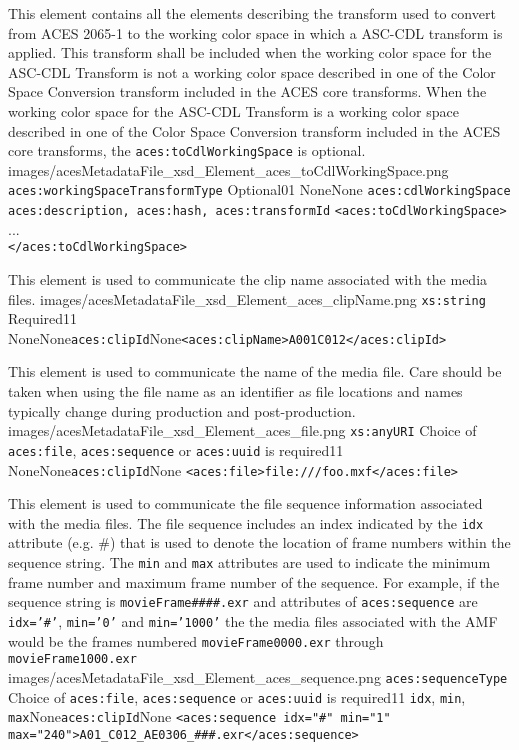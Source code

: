         {This element contains all the elements describing the transform used to convert from ACES 2065-1 to the working color space in which a ASC-CDL transform is applied.  This transform shall be included when the working color space for the ASC-CDL Transform is not a working color space described in one of the Color Space Conversion transform included in the ACES core transforms.  When the working color space for the ASC-CDL Transform is a working color space described in one of the Color Space Conversion transform included in the ACES core transforms, the \texttt{aces:toCdlWorkingSpace} is optional.}
        {images/acesMetadataFile_xsd_Element_aces_toCdlWorkingSpace.png}
        {\texttt{aces:workingSpaceTransformType}}
        {Optional}{0}{1}
        {None}{None}
        {\texttt{aces:cdlWorkingSpace}}
        {\texttt{aces:description, aces:hash, aces:transformId}}
        {\lstinline{<aces:toCdlWorkingSpace>} \\
        ... \\
        \lstinline{</aces:toCdlWorkingSpace>}}

        {This element is used to communicate the clip name associated with the media files.}
        {images/acesMetadataFile_xsd_Element_aces_clipName.png}
        {\texttt{xs:string}}
        {Required}{1}{1}
        {None}{None}{\texttt{aces:clipId}}{None}{\lstinline{<aces:clipName>A001C012</aces:clipId>}}

        {This element is used to communicate the name of the media file.  Care should be taken when using the file name as an identifier as file locations and names typically change during production and post-production.}
        {images/acesMetadataFile_xsd_Element_aces_file.png}
        {\texttt{xs:anyURI}}
        {Choice of \texttt{aces:file}, \texttt{aces:sequence} or \texttt{aces:uuid} is required}{1}{1}
        {None}{None}{\texttt{aces:clipId}}{None}
        {\lstinline{<aces:file>file:///foo.mxf</aces:file>}}

        {This element is used to communicate the file sequence information associated with the media files.  The file sequence includes an index indicated by the \texttt{idx} attribute (e.g. \#) that is used to denote the location of frame numbers within the sequence string.  The \texttt{min} and \texttt{max} attributes are used to indicate the minimum frame number and maximum frame number of the sequence.  For example, if the sequence string is \texttt{movieFrame\#\#\#\#.exr} and attributes of \texttt{aces:sequence} are \texttt{idx='\#'}, \texttt{min='0'} and \texttt{min='1000'} the the media files associated with the AMF would be the frames numbered \texttt{movieFrame0000.exr} through \texttt{movieFrame1000.exr}}
        {images/acesMetadataFile_xsd_Element_aces_sequence.png}
        {\texttt{aces:sequenceType}}
        {Choice of \texttt{aces:file}, \texttt{aces:sequence} or \texttt{aces:uuid} is required}{1}{1}
        {\texttt{idx}, \texttt{min}, \texttt{max}}{None}{\texttt{aces:clipId}}{None}
        {\lstinline{<aces:sequence idx="#" min="1" max="240">A01_C012_AE0306_###.exr</aces:sequence>}}

